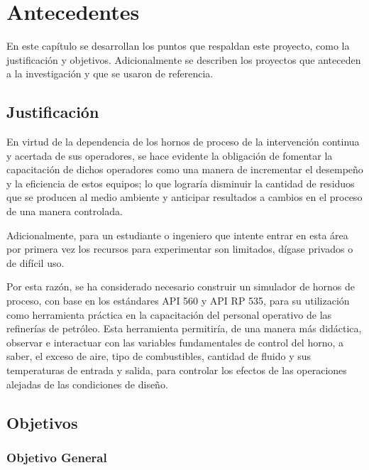 \chapter{Antecedentes}

\par En este capítulo se desarrollan los puntos que respaldan este proyecto, como la justificación y objetivos. Adicionalmente se describen los proyectos que anteceden a la investigación y que se usaron de referencia.

\section{Justificación}

\par En virtud de la dependencia de los hornos de proceso de la intervención continua y acertada de sus operadores, se hace evidente la obligación de fomentar la capacitación de dichos operadores como una manera de incrementar el desempeño y la eficiencia de estos equipos; lo que lograría disminuir la cantidad de residuos que se producen al medio ambiente y anticipar resultados a cambios en el proceso de una manera controlada.

\par Adicionalmente, para un estudiante o ingeniero que intente entrar en esta área por primera vez los recursos para experimentar son limitados, dígase privados o de difícil uso.

\par Por esta razón, se ha considerado necesario construir un simulador de hornos de proceso, con base en los estándares API 560\cite{bib:api560} y API RP 535, para su utilización como herramienta práctica en la capacitación del personal operativo de las refinerías de petróleo. Esta herramienta permitiría, de una manera más didáctica, observar e interactuar con las variables fundamentales de control del horno, a saber, el exceso de aire, tipo de combustibles, cantidad de fluido y sus temperaturas de entrada y salida, para controlar los efectos de las operaciones alejadas de las condiciones de diseño.

\section{Objetivos}

\subsection{Objetivo General}

